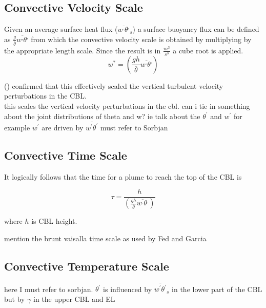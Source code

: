 \subsection{Convective Velocity Scale}
\label{subsec:}

Given an average surface heat flux ($\overline{w^{,}\theta^{,}}_{s}$) a surface buoyancy flux can be defined as 
$\frac{g}{\overline{\theta}}\overline{w^{,}\theta^{,}}$ from which the convective velocity scale is obtained by
multiplying by the appropriate length scale.  Since the result is in $\frac{m^{3}}{s^{3}}$ a cube root is applied.\\

\begin{equation}
w^{*} = \left( \frac{gh}{\overline{\theta}}\overline{w^{,}\theta^{,}} \right)
\end{equation}

\citeauthor{Deardorff70} (\cite{Deardorff70}) confirmed that this effectively scaled the vertical turbulent velocity
perturbations in the \acs{CBL}.\\

this scales the vertical velocity perturbations in the cbl. 
can i tie in something about the joint distributions of theta and w?
ie talk about the $\theta^{'}$ and $w^{'}$
for example $w^{'}$ are driven by $\overline{w^{'}\theta^{'}}$
must refer to Sorbjan

\subsection{Convective Time Scale}
\label{}

It logically follows that the time for a plume to reach the top of the \acs{CBL} is

\begin{equation}
\tau = \frac{h}{\left( \frac{gh}{\overline{\theta}}\overline{w^{,}\theta^{,}} \right)}
\end{equation}

where $h$ is \acs{CBL} height.

mention the brunt vaisalla time scale as used by Fed and Garcia

\subsection{Convective Temperature Scale}
\label{}

here I must refer to sorbjan.  $\theta^{'}$ is influenced by $\overline{w^{'}\theta^{'}}_{s}$
in the lower part of the \acs{CBL} but by $\gamma$ in the upper \acs{CBL} and \acs{EL}

